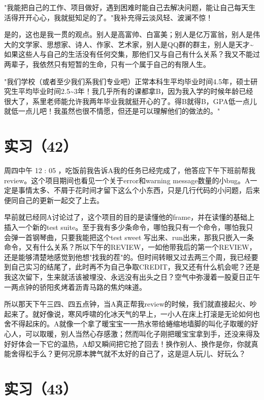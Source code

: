 \documentclass[12pt]{book}
\begin{document}
"我能把自己的工作、项目做好，遇到困难时能自己去解决问题，能让自己每天生活得开开心心，我就挺知足的了。"我补充得云淡风轻、波澜不惊！

是的，这也是我一贯的观点。别人是高富帅、白富美；别人是亿万富翁，别人是伟大的文学家、思想家、诗人、作家、艺术家，别人是QQ群的群主，别人是天才\textasciitilde{}~ 如果这些人与自己的生活没有任何交集，那他们又与自己有什么关系？我又不能过两辈子，我依然只有短暂的生命，只有一个属于自己的有限人生。

"我们学校（或者至少我们系我们专业吧）正常本科生平均毕业时间4.5年，硕士研究生平均毕业时间2.5\textasciitilde{}3年！我几乎所有的课都拿B，因为我入学的时候年龄已经很大了，系里老师能允许我两年毕业我就挺开心的了。得B就得B，GPA低一点儿就低一点儿吧！我虽然也很不情愿，但还是可以理解他们的做法的。"


\section{实习（42）}
\label{sec-5-45}

周四中午 12 : 05 ，吃饭前我告诉A我的任务已经完成了，他答应下午下班前帮我review。这个项目期间也看见一个关于error和warning message数量的小bug。A一定是事情太多、不屑于花时间才留下这么个小东西，只是几行代码的小问题，后来便同自己的更新一起交了上去。

早前就已经同A讨论过了，这个项目的目的是读懂他的frame，并在读懂的基础上插入一个新的test suite。至于我有多少条命令，哪怕我只有一个命令，哪怕我只会弹一首钢琴曲，只要我能把这个test sweet 写出来、run出来，那我只嵌入一条命令，又有什么关系？所以下午的REVIEW，一如他带我后的第一个REVIEW，还是能够清楚地感觉到他想"找我的茬"的。但时间转眼又过去两三个周，我已经要到自己实习的结尾了，此时再不为自己争取CREDIT，我又还有什么机会呢？还是我这次留下，生来就活该被埋没、永远没有出头之日？空气中弥漫着一股夏日正午一两点钟的骄阳炙烤着沥青马路的焦灼味道。

所以那天下午三四、四五点钟，当A真正帮我review的时候，我们就直接起火、吵起来了。就好像说，寒风呼啸的化冰天气的早上，一小人在床上打滚是无论如何也舍不得起床的。A就像一个拿了暖宝宝一一热水带给蜷缩地墙脚的叫化子取暖的好心人，可以取暖，别人当然心存感激；然而叫化子刚把暖宝宝拿到手，还没来得及好好体会一下它的温热，A却又瞬间把它抢了回去！换作别人、换作是你，你就真能舍得松手么？更何况原本脾气就不太好的自己了，这是逗人玩儿、好玩么？


\section{实习（43）}
\label{sec-5-46}
\end{document}

